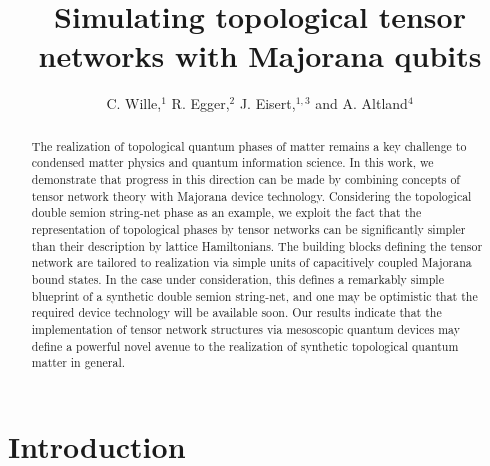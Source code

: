 \documentclass[twocolumn,floats,prx,showpacs]{revtex4-1}
\begin{document}
\title{Simulating topological tensor networks with Majorana qubits} 

\author{C. Wille,$^1$ R. Egger,$^2$ J. Eisert,$^{1,3}$ and A. Altland$^4$}

\begin{abstract}
The realization of topological quantum phases of matter remains a key challenge to condensed matter physics and quantum information science. In this work, we  demonstrate that progress in this direction can be made by combining concepts of tensor network theory with Majorana device technology. Considering the topological double semion string-net phase as an example, we exploit the fact that the representation of topological phases by tensor networks can be significantly simpler than their description by lattice Hamiltonians. The building blocks defining the tensor network are tailored to realization via simple units of capacitively coupled Majorana bound states. In the case under consideration,  this defines a remarkably simple blueprint of a synthetic double semion string-net,
and one may be optimistic that the required device technology will be available soon.  Our results indicate that the implementation of  tensor network structures via mesoscopic quantum devices may define a powerful novel avenue to the realization of synthetic topological quantum matter in general.
\end{abstract}
\maketitle

\section{Introduction}
\end{document}
